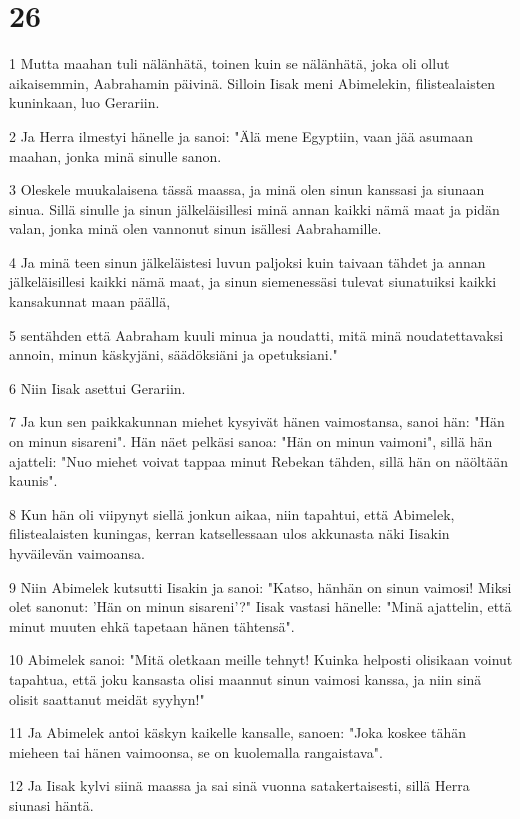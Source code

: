 \chapter{26}

\par 1 Mutta maahan tuli nälänhätä, toinen kuin se nälänhätä, joka oli ollut aikaisemmin, Aabrahamin päivinä. Silloin Iisak meni Abimelekin, filistealaisten kuninkaan, luo Gerariin.
\par 2 Ja Herra ilmestyi hänelle ja sanoi: "Älä mene Egyptiin, vaan jää asumaan maahan, jonka minä sinulle sanon.
\par 3 Oleskele muukalaisena tässä maassa, ja minä olen sinun kanssasi ja siunaan sinua. Sillä sinulle ja sinun jälkeläisillesi minä annan kaikki nämä maat ja pidän valan, jonka minä olen vannonut sinun isällesi Aabrahamille.
\par 4 Ja minä teen sinun jälkeläistesi luvun paljoksi kuin taivaan tähdet ja annan jälkeläisillesi kaikki nämä maat, ja sinun siemenessäsi tulevat siunatuiksi kaikki kansakunnat maan päällä,
\par 5 sentähden että Aabraham kuuli minua ja noudatti, mitä minä noudatettavaksi annoin, minun käskyjäni, säädöksiäni ja opetuksiani."
\par 6 Niin Iisak asettui Gerariin.
\par 7 Ja kun sen paikkakunnan miehet kysyivät hänen vaimostansa, sanoi hän: "Hän on minun sisareni". Hän näet pelkäsi sanoa: "Hän on minun vaimoni", sillä hän ajatteli: "Nuo miehet voivat tappaa minut Rebekan tähden, sillä hän on näöltään kaunis".
\par 8 Kun hän oli viipynyt siellä jonkun aikaa, niin tapahtui, että Abimelek, filistealaisten kuningas, kerran katsellessaan ulos akkunasta näki Iisakin hyväilevän vaimoansa.
\par 9 Niin Abimelek kutsutti Iisakin ja sanoi: "Katso, hänhän on sinun vaimosi! Miksi olet sanonut: 'Hän on minun sisareni'?" Iisak vastasi hänelle: "Minä ajattelin, että minut muuten ehkä tapetaan hänen tähtensä".
\par 10 Abimelek sanoi: "Mitä oletkaan meille tehnyt! Kuinka helposti olisikaan voinut tapahtua, että joku kansasta olisi maannut sinun vaimosi kanssa, ja niin sinä olisit saattanut meidät syyhyn!"
\par 11 Ja Abimelek antoi käskyn kaikelle kansalle, sanoen: "Joka koskee tähän mieheen tai hänen vaimoonsa, se on kuolemalla rangaistava".
\par 12 Ja Iisak kylvi siinä maassa ja sai sinä vuonna satakertaisesti, sillä Herra siunasi häntä.
